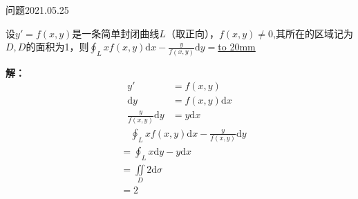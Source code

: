 \begin{mybox}{问题2021.05.25}
	
	\qquad 设$y'=f(x,y)$是一条简单封闭曲线$L$（取正向），$f(x,y)\ne 0$,其所在的区域记为$D,D$的面积为1，则$\oint_{L}xf(x,y)\mathrm{d}x-\frac{y}{f(x,y)}\mathrm{d}y=$\underline{\hbox to 20mm{}}
\end{mybox}
\noindent
\textbf{解：}
\begin{align*}
	y'&=f(x,y)\\
	\mathrm{d}y&=f(x,y)\mathrm{d}x\\
	\frac{y}{f(x,y)}\mathrm{d}y&=y\mathrm{d}x
\end{align*}
\begin{align*}
	&\quad\oint_{L}xf(x,y)\mathrm{d}x-\frac{y}{f(x,y)}\mathrm{d}y\\
	&=\oint_{L}x\mathrm{d}y-y\mathrm{d}x\\
	   &=\iint\limits_{D} 2\mathrm{d}\sigma\\
	   &=2
\end{align*}